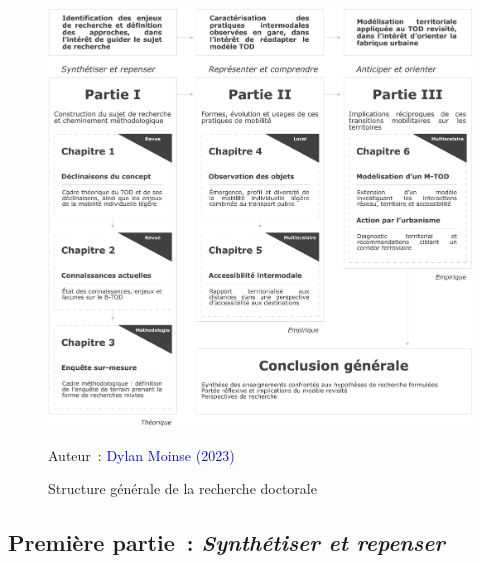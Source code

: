 \begin{refsegment}
    \begin{figure}[h!]\vspace*{4pt}
        \caption{Structure générale de la recherche doctorale}
        \label{fig-introduction:structure-these}
        \centerline{\includegraphics[width=1\columnwidth]{src/Figures/Introduction/FR_Structure_these.pdf}}
        \vspace{5pt}
        \begin{flushright}\scriptsize{
        Auteur~: \textcolor{blue}{Dylan Moinse (2023)}
        }\end{flushright}
    \end{figure}

\subsection*{Première partie~: \textsl{Synthétiser et repenser}
    \label{introduction-generale:annonce-plan-1}
    }


\end{refsegment}
